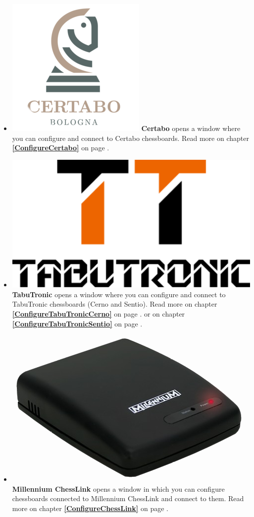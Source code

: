 \documentclass[11pt,a4paper]{article}
\begin{document}
\begin{itemize}
	\item  \includegraphics[scale=0.1]{Certabo_icon.png} \textbf{Certabo} opens a window where you can configure and connect to Certabo chessboards.  Read more on chapter \textbf{\ref{ConfigureCertabo}  } on page \pageref{ConfigureCertabo}.
\item  \includegraphics[scale=0.05]{tabutronic_logo_def.png} \textbf{TabuTronic} opens a window where you can configure and connect to TabuTronic chessboards (Cerno and Sentio).
Read more on chapter \textbf{\ref{ConfigureTabuTronicCerno}  } on page \pageref{ConfigureTabuTronicCerno}.	
or on chapter \textbf{\ref{ConfigureTabuTronicSentio}  } on page \pageref{ConfigureTabuTronicSentio}.	
	\item  \includegraphics[scale=0.05]{Millennium ChessLink.png} \textbf{Millennium ChessLink} opens a window in which you can configure chessboards connected to Millennium ChessLink and connect to them.  Read more on chapter \textbf{\ref{ConfigureChessLink}  } on page \pageref{ConfigureChessLink}.

\end{itemize}
\end{document}
